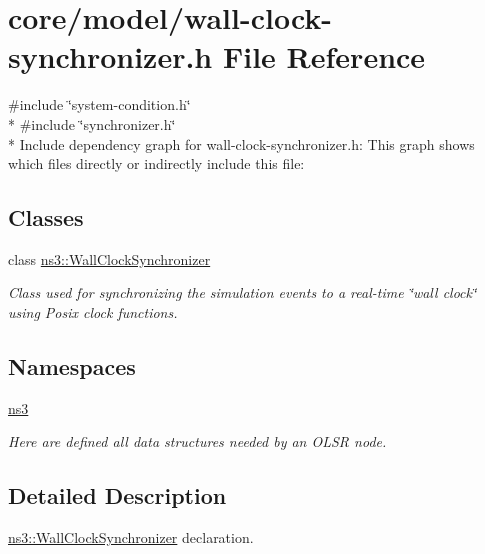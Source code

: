 \hypertarget{wall-clock-synchronizer_8h}{}\section{core/model/wall-\/clock-\/synchronizer.h File Reference}
\label{wall-clock-synchronizer_8h}
{\ttfamily \#include \char`\"{}system-\/condition.\+h\char`\"{}}\\*
{\ttfamily \#include \char`\"{}synchronizer.\+h\char`\"{}}\\*
Include dependency graph for wall-\/clock-\/synchronizer.h\+:
This graph shows which files directly or indirectly include this file\+:
\subsection*{Classes}
\begin{DoxyCompactItemize}
\item 
class \hyperlink{classns3_1_1WallClockSynchronizer}{ns3\+::\+Wall\+Clock\+Synchronizer}
\begin{DoxyCompactList}\small\item\em Class used for synchronizing the simulation events to a real-\/time \char`\"{}wall clock\char`\"{} using Posix clock functions. \end{DoxyCompactList}\end{DoxyCompactItemize}
\subsection*{Namespaces}
\begin{DoxyCompactItemize}
\item 
 \hyperlink{namespacens3}{ns3}
\begin{DoxyCompactList}\small\item\em Here are defined all data structures needed by an O\+L\+SR node. \end{DoxyCompactList}\end{DoxyCompactItemize}


\subsection{Detailed Description}
\hyperlink{classns3_1_1WallClockSynchronizer}{ns3\+::\+Wall\+Clock\+Synchronizer} declaration. 